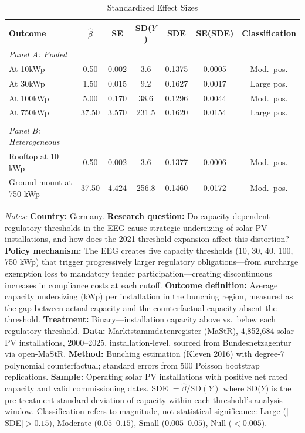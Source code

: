 \begin{table}[t]
\centering
\caption{Standardized Effect Sizes}
\label{tab:sde}
\begin{threeparttable}
\footnotesize
\begin{tabular}{lcccccc}
\toprule
Outcome & $\hat{\beta}$ & SE & SD($Y$) & SDE & SE(SDE) & Classification \\
\midrule
\textit{Panel A: Pooled} & & & & & & \\
\quad At 10kWp & 0.50 & 0.002 & 3.6 & 0.1375 & 0.0005 & Mod.\ pos. \\
\quad At 30kWp & 1.50 & 0.015 & 9.2 & 0.1627 & 0.0017 & Large pos. \\
\quad At 100kWp & 5.00 & 0.170 & 38.6 & 0.1296 & 0.0044 & Mod.\ pos. \\
\quad At 750kWp & 37.50 & 3.570 & 231.5 & 0.1620 & 0.0154 & Large pos. \\
 & & & & & & \\
\textit{Panel B: Heterogeneous} & & & & & & \\
\quad Rooftop at 10 kWp & 0.50 & 0.002 & 3.6 & 0.1377 & 0.0006 & Mod.\ pos. \\
\quad Ground-mount at 750 kWp & 37.50 & 4.424 & 256.8 & 0.1460 & 0.0172 & Mod.\ pos. \\
\bottomrule
\end{tabular}
\begin{tablenotes}[flushleft]\scriptsize\sloppy
\item \textit{Notes:} \textbf{Country:} Germany. \textbf{Research question:} Do capacity-dependent regulatory thresholds in the EEG cause strategic undersizing of solar PV installations, and how does the 2021 threshold expansion affect this distortion? \textbf{Policy mechanism:} The EEG creates five capacity thresholds (10, 30, 40, 100, 750 kWp) that trigger progressively larger regulatory obligations---from surcharge exemption loss to mandatory tender participation---creating discontinuous increases in compliance costs at each cutoff. \textbf{Outcome definition:} Average capacity undersizing (kWp) per installation in the bunching region, measured as the gap between actual capacity and the counterfactual capacity absent the threshold. \textbf{Treatment:} Binary---installation capacity above vs.\ below each regulatory threshold. \textbf{Data:} Marktstammdatenregister (MaStR), 4,852,684 solar PV installations, 2000--2025, installation-level, sourced from Bundesnetzagentur via open-MaStR. \textbf{Method:} Bunching estimation (Kleven 2016) with degree-7 polynomial counterfactual; standard errors from 500 Poisson bootstrap replications. \textbf{Sample:} Operating solar PV installations with positive net rated capacity and valid commissioning dates. SDE $= \hat{\beta} / \text{SD}(Y)$ where SD($Y$) is the pre-treatment standard deviation of capacity within each threshold's analysis window. Classification refers to magnitude, not statistical significance: Large ($|$SDE$| > 0.15$), Moderate ($0.05$--$0.15$), Small ($0.005$--$0.05$), Null ($< 0.005$).
\end{tablenotes}
\end{threeparttable}
\end{table}
